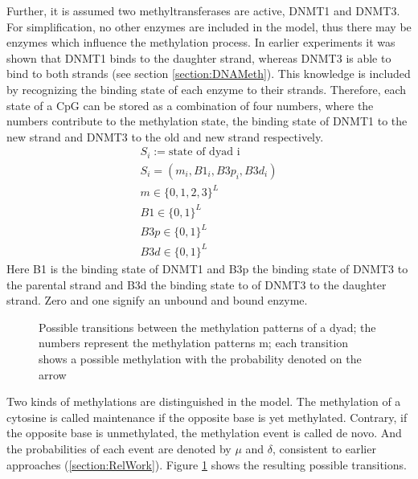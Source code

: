 Further, it is assumed two methyltransferases are active, DNMT1 and DNMT3. For simplification, no other enzymes are included in the model, thus there may be enzymes which influence the methylation process. In earlier experiments it was shown that DNMT1 binds to the daughter strand, whereas DNMT3 is able to bind to both strands (see section \ref{section:DNAMeth}). This knowledge is included by recognizing the binding state of each enzyme to their strands.\newline
Therefore, each state of a \ac{CpG} can be stored as a combination of four numbers, where the numbers contribute to the methylation state, the binding state of DNMT1 to the new strand and DNMT3 to the old and new strand respectively.
\begin{align*}
S_i := \text{state of dyad i}\\
S_i = (m_i, B1_i, B3p_i, B3d_i)\\
m \in \{0,1,2,3\}^L\\
B1 \in \{0,1\}^L\\
B3p \in \{0,1\}^L\\
B3d \in \{0,1\}^L
\end{align*}
Here B1 is the binding state of DNMT1 and B3p the binding state of DNMT3 to the parental strand and B3d the binding state to of DNMT3 to the daughter strand. Zero and one signify an unbound and bound enzyme.\\

\begin{figure}[h]
\centering
{}
\caption{Possible transitions between the methylation patterns of a dyad; the numbers represent the methylation patterns m; each transition shows a possible methylation with the probability denoted on the arrow}
\label{mhy}
\end{figure}
Two kinds of methylations are distinguished in the model. The methylation of a cytosine is called maintenance if the opposite base is yet methylated. Contrary, if the opposite base is unmethylated, the methylation event is called de novo. And the probabilities of each event are denoted by $\mu$ and $\delta$, consistent to earlier approaches (\ref{section:RelWork}). Figure \ref{mhy} shows the resulting possible transitions.\\

